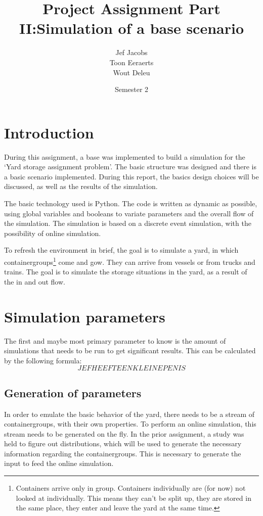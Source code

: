 \documentclass[]{article}
\title{Project Assignment Part II:\@ Simulation of a base scenario }
\author{Jef Jacobs \\ Toon Eeraerts \\ Wout Deleu}
\date{Semester 2}
\begin{document}
\setlength{\parindent}{0pt} \maketitle \tableofcontents \newpage %

\section{Introduction}
During this assignment, a base was implemented to build a simulation for the
`Yard storage assignment problem'. The basic structure was designed and there
is a basic scenario implemented. During this report, the basics design choices
will be discussed, as well as the results of the simulation.

The basic technology used is Python. The code is written as dynamic as
possible, using global variables and booleans to variate parameters and the
overall flow of the simulation. The simulation is based on a discrete event
simulation, with the possibility of online simulation.

To refresh the environment in brief, the goal is to simulate a yard, in which
containergroups\footnote{Containers arrive only in group. Containers
	individually are (for now) not looked at individually. This means they can't be
	split up, they are stored in the same place, they enter and leave the yard at
	the same time.} come and gow. They can arrive from vessels or from trucks and
trains. The goal is to simulate the storage situations in the yard, as a result
of the in and out flow.

\section{Simulation parameters}
The first and maybe most primary parameter to know is the amount of simulations
that needs to be run to get significant results. This can be calculated by the
following formula: $$ JEF HEEFT EEN KLEINE PENIS $$

\subsection{Generation of parameters}
In order to emulate the basic behavior of the yard, there needs to be a stream
of containergroups, with their own properties. To perform an online simulation,
this stream needs to be generated on the fly. In the prior assignment, a study
was held to figure out distributions, which will be used to generate the
necessary information regarding the containergroups. This is necessary to
generate the input to feed the online simulation.
\end{document}
